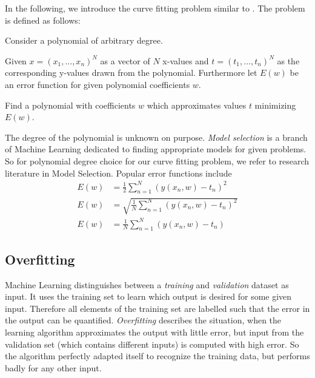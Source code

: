In the following, we introduce the curve fitting problem similar to \cite[p.~4~ff.]{Bishop}.
The problem is defined as follows:

\begin{problem}
  Consider a polynomial of arbitrary degree.

  \begin{description}
  \item{Given}
  $x = (x_1, \ldots, x_n)^N$ as a vector of $N$ x-values and
  $t = (t_1, \ldots, t_n)^N$ as the corresponding y-values drawn from the polynomial.
  Furthermore let $E(w)$ be an error function for given polynomial coefficients $w$.

  \item{Find}
  a polynomial with coefficients $w$ which approximates values $t$ minimizing $E(w)$.
  \end{description}
\end{problem}

The degree of the polynomial is unknown on purpose.
\emph{Model selection} is a branch of Machine Learning dedicated to finding appropriate models for given problems.
So for polynomial degree choice for our curve fitting problem, we refer to research literature in Model Selection. 
Popular error functions include
\begin{align}
  E(w) &= \frac12 \sum_{n=1}^N \left(y(x_n, w) - t_n\right)^2 \tag{Mean squared error, MSE} \\
  E(w) &= \sqrt{\frac{1}{N} \sum_{n=1}^N (y(x_n, w) - t_n)^2} \tag{Root mean square, RMS} \\
  E(w) &= \frac1N \sum_{n=1}^N (y(x_n, w) - t_n)              \tag{Mean signed deviation, MSD}
\end{align}

\subsection{Overfitting}
\label{sec:bp-overfitting}
%
Machine Learning distinguishes between a \emph{training} and \emph{validation} dataset as input.
It uses the training set to learn which output is desired for some given input.
Therefore all elements of the training set are labelled such that the error in the output can be quantified.
\emph{Overfitting} describes the situation, when the learning algorithm approximates the output with little error,
but input from the validation set (which contains different inputs) is computed with high error.
So the algorithm perfectly adapted itself to recognize the training data, but performs badly for any other input.

